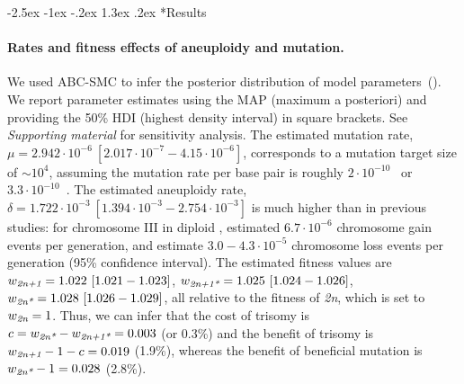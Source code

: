 \documentclass[12pt]{extarticle}
\makeatletter
\renewcommand\section{\@startsection {section}{1}{\z@}%
     {-2.5ex \@plus -1ex \@minus -.2ex}%
     {1.3ex \@plus.2ex}%
    {\Large\bfseries}}
\newcommand{\euwt}{\emph{2n}}
\newcommand{\anwt}{\emph{2n+1}}
\newcommand{\eumt}{\emph{2n*}}
\newcommand{\anmt}{\emph{2n+1*}}
\makeatother
\begin{document}
\section*{Results}

\paragraph{Rates and fitness effects of aneuploidy and mutation.} 
We used ABC-SMC to infer the posterior distribution of model parameters~(). 
We report parameter estimates using the MAP (maximum a posteriori) and providing the 50\% HDI (highest density interval) in square brackets. See \emph{Supporting material} for sensitivity analysis.
The estimated mutation rate, $\mu=2.942\cdot10^{-6}\ [2.017\cdot10^{-7}-4.15\cdot10^{-6}]$, corresponds to a mutation target size of $\sim 10^{4}$, assuming the mutation rate per base pair is roughly $2\cdot10^{-10}$~\citep{Zhu2014} or $3.3\cdot10^{-10}$~\citep{Lynch2008}.
The estimated aneuploidy rate, $\delta=1.722\cdot10^{-3}\ [1.394\cdot10^{-3}-2.754\cdot10^{-3}]$ is much higher than in previous studies: for chromosome III in diploid \yeast, \citet{Zhu2014} estimated $6.7\cdot10^{-6}$ chromosome gain events per generation, and \citet{Kumaran2013} estimate $3.0-4.3\cdot10^{-5}$ chromosome loss events per generation (95\% confidence interval).
The estimated fitness values are $w_{\anwt}=1.022\ [1.021-1.023]$,
$w_{\anmt}=1.025\ [1.024-1.026]$,
$w_{\eumt}=1.028\ [1.026-1.029]$, all relative to the fitness of \euwt, which is set to $w_{\euwt}=1$. 
Thus, we can infer that the cost of trisomy is $c = w_{\eumt}-w_{\anmt} = 0.003$ (or 0.3\%) and the benefit of trisomy is $w_{\anwt}-1-c=0.019$ (1.9\%), whereas the benefit of beneficial mutation is $w_{\eumt}-1=0.028$ (2.8\%).
\end{document}

